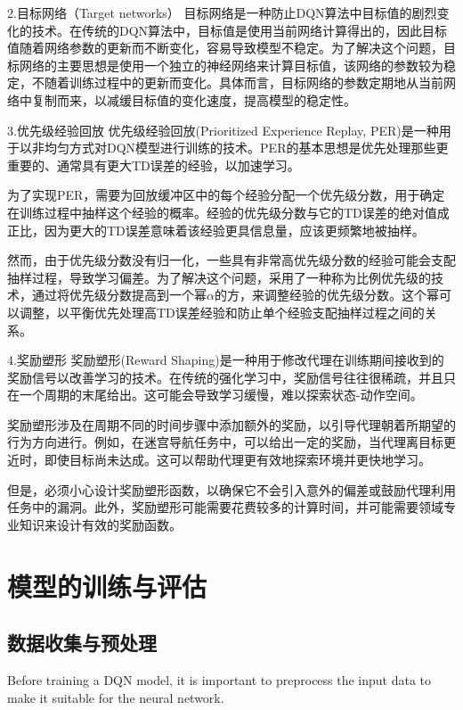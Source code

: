 2.目标网络（Target networks）
目标网络是一种防止DQN算法中目标值的剧烈变化的技术。在传统的DQN算法中，目标值是使用当前网络计算得出的，因此目标值随着网络参数的更新而不断变化，容易导致模型不稳定。为了解决这个问题，目标网络的主要思想是使用一个独立的神经网络来计算目标值，该网络的参数较为稳定，不随着训练过程中的更新而变化。具体而言，目标网络的参数定期地从当前网络中复制而来，以减缓目标值的变化速度，提高模型的稳定性。

3.优先级经验回放
优先级经验回放(Prioritized Experience Replay, PER)是一种用于以非均匀方式对DQN模型进行训练的技术。PER的基本思想是优先处理那些更重要的、通常具有更大TD误差的经验，以加速学习。

为了实现PER，需要为回放缓冲区中的每个经验分配一个优先级分数，用于确定在训练过程中抽样这个经验的概率。经验的优先级分数与它的TD误差的绝对值成正比，因为更大的TD误差意味着该经验更具信息量，应该更频繁地被抽样。

然而，由于优先级分数没有归一化，一些具有非常高优先级分数的经验可能会支配抽样过程，导致学习偏差。为了解决这个问题，采用了一种称为比例优先级的技术，通过将优先级分数提高到一个幂$\alpha$的方，来调整经验的优先级分数。这个幂可以调整，以平衡优先处理高TD误差经验和防止单个经验支配抽样过程之间的关系。

4.奖励塑形
奖励塑形(Reward Shaping)是一种用于修改代理在训练期间接收到的奖励信号以改善学习的技术。在传统的强化学习中，奖励信号往往很稀疏，并且只在一个周期的末尾给出。这可能会导致学习缓慢，难以探索状态-动作空间。

奖励塑形涉及在周期不同的时间步骤中添加额外的奖励，以引导代理朝着所期望的行为方向进行。例如，在迷宫导航任务中，可以给出一定的奖励，当代理离目标更近时，即使目标尚未达成。这可以帮助代理更有效地探索环境并更快地学习。

但是，必须小心设计奖励塑形函数，以确保它不会引入意外的偏差或鼓励代理利用任务中的漏洞。此外，奖励塑形可能需要花费较多的计算时间，并可能需要领域专业知识来设计有效的奖励函数。

\section{模型的训练与评估}

\subsection{数据收集与预处理}

Before training a DQN model, it is important to preprocess the input data to make it suitable for the neural network.

